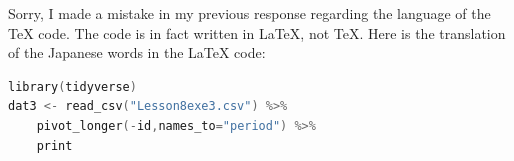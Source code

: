 Sorry, I made a mistake in my previous response regarding the language of the TeX code. The code is in fact written in LaTeX, not TeX. Here is the translation of the Japanese words in the LaTeX code:

\begin{lstlisting}[language=c++,label={code:27_09},caption={Read and execute data from an external file}]
library(tidyverse)
dat3 <- read_csv("Lesson8exe3.csv") %>% 
    pivot_longer(-id,names_to="period") %>% 
    print
\end{lstlisting}
